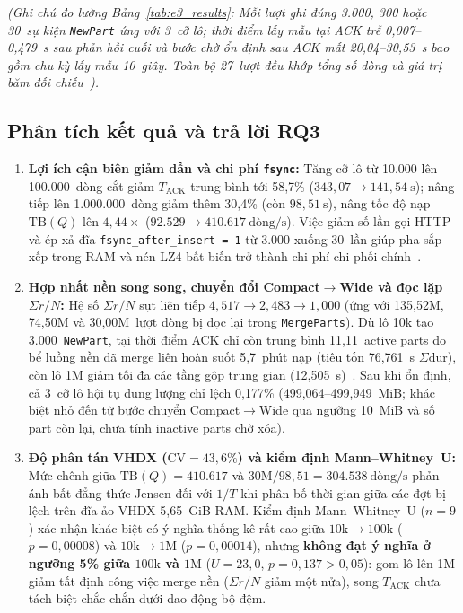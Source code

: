 \documentclass[13pt,a4paper]{report}
\begin{document}
\noindent\textit{(Ghi chú đo lường Bảng~\ref{tab:e3_results}: Mỗi lượt ghi đúng 3.000, 300 hoặc 30~sự kiện \texttt{NewPart} ứng với 3~cỡ lô; thời điểm lấy mẫu tại ACK trễ 0,007--0,479~s sau phản hồi cuối và bước chờ ổn định sau ACK mất 20,04--30,53~s bao gồm chu kỳ lấy mẫu 10~giây. Toàn bộ 27~lượt đều khớp tổng số dòng và giá trị băm đối chiếu~\cite{M7}).}

\subsection{Phân tích kết quả và trả lời RQ3}
\begin{enumerate}
    \setlength{\itemsep}{3pt}\setlength{\parskip}{0pt}
    \item \textbf{Lợi ích cận biên giảm dần và chi phí \texttt{fsync}:} Tăng cỡ lô từ 10.000 lên 100.000~dòng cắt giảm $T_{\text{ACK}}$ trung bình tới 58,7\% ($343{,}07 \rightarrow 141{,}54~\text{s}$); nâng tiếp lên 1.000.000~dòng giảm thêm 30,4\% (còn $98{,}51~\text{s}$), nâng tốc độ nạp $\text{TB}(Q)$ lên $4{,}44{\times}$ ($92.529 \rightarrow 410.617~\text{dòng/s}$). Việc giảm số lần gọi HTTP và ép xả đĩa \texttt{fsync\_\allowbreak{}after\_\allowbreak{}insert = 1} từ 3.000 xuống 30~lần giúp pha sắp xếp trong RAM và nén LZ4 bất biến trở thành chi phí chi phối chính~\cite{S9}.
    \item \textbf{Hợp nhất nền song song, chuyển đổi Compact$\rightarrow$Wide và đọc lặp $\Sigma r / N$:} Hệ số $\Sigma r / N$ sụt liên tiếp $4{,}517 \rightarrow 2{,}483 \rightarrow 1{,}000$ (ứng với 135,52M, 74,50M và 30,00M~lượt dòng bị đọc lại trong \texttt{MergeParts}). Dù lô 10k tạo 3.000~\texttt{NewPart}, tại thời điểm ACK chỉ còn trung bình 11,11~active parts do bể luồng nền đã merge liên hoàn suốt 5,7~phút nạp (tiêu tốn 76,761~s $\Sigma\text{dur}$), còn lô 1M giảm tối đa các tầng gộp trung gian (12,505~s)~\cite{S5}. Sau khi ổn định, cả 3~cỡ lô hội tụ dung lượng chỉ lệch 0,177\% (499,064--499,949~MiB; khác biệt nhỏ đến từ bước chuyển Compact$\rightarrow$Wide qua ngưỡng 10~MiB và số part còn lại, chưa tính inactive parts chờ xóa).
    \item \textbf{Độ phân tán VHDX ($\text{CV} = 43{,}6\%$) và kiểm định Mann--Whitney~U:} Mức chênh giữa $\text{TB}(Q) = 410.617$ và $30\text{M}/98{,}51 = 304.538~\text{dòng/s}$ phản ánh bất đẳng thức Jensen đối với $1/T$ khi phân bố thời gian giữa các đợt bị lệch trên đĩa ảo VHDX 5,65~GiB RAM. Kiểm định Mann--Whitney~U ($n = 9$) xác nhận khác biệt có ý nghĩa thống kê rất cao giữa $10\text{k} \rightarrow 100\text{k}$ ($p = 0{,}00008$) và $10\text{k} \rightarrow 1\text{M}$ ($p = 0{,}00014$), nhưng \textbf{không đạt ý nghĩa ở ngưỡng 5\% giữa $100\text{k}$ và $1\text{M}$} ($U = 23{,}0$, $p = 0{,}137 > 0{,}05$): gom lô lên 1M giảm tất định công việc merge nền ($\Sigma r / N$ giảm một nửa), song $T_{\text{ACK}}$ chưa tách biệt chắc chắn dưới dao động bộ đệm.

\end{enumerate}
\end{document}
